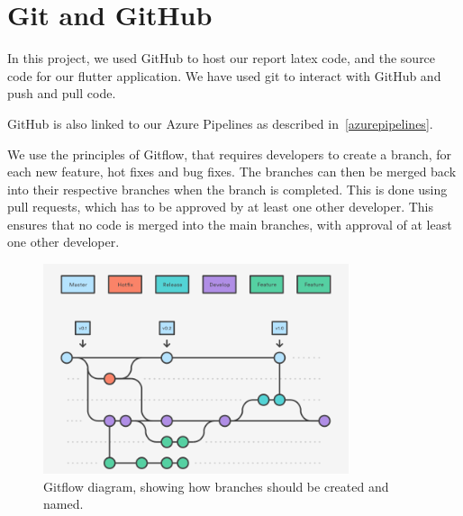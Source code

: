 \section{Git and GitHub}
In this project, we used GitHub to host our report latex code, and the source code for our flutter application.
We have used git to interact with GitHub and push and pull code. 

GitHub is also linked to our Azure Pipelines as described in~\autoref{azurepipelines}.

We use the principles of Gitflow, that requires developers to create a branch, for each new feature, hot fixes and bug fixes. 
The branches can then be merged back into their respective branches when the branch is completed.
This is done using pull requests, which has to be approved by at least one other developer.
This ensures that no code is merged into the main branches, with approval of at least one other developer.

\begin{figure}[H]
    \includegraphics[width=0.8\textwidth]{images/GitFlow.png}
    \caption{Gitflow diagram, showing how branches should be created and named.}
    \label{Gitflow}
\end{figure}

